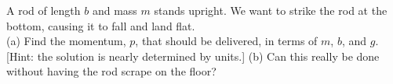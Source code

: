 A rod of length $b$ and mass $m$ stands upright. We want
to strike the rod at the bottom, causing it to fall and land flat.\\
(a) Find the momentum, $p$, that should be delivered, in terms of $m$, $b$,
and $g$. [Hint: the solution is nearly determined by units.]\answercheck\hwendpart
(b) Can this really be done without having the rod scrape on the floor?
